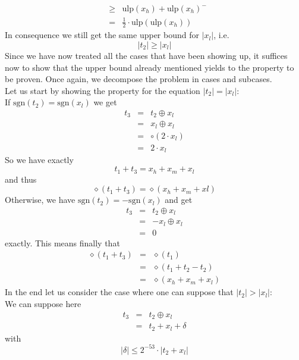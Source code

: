 \documentclass[a4paper,10pt,twoside]{article}
\newenvironment{proof}[1][Proof]{\begin{trivlist}
\item[\hskip \labelsep {\bfseries #1}]}{\end{trivlist}}
\newcommand{\hi}{\ensuremath{\mathit{h}}}
\newcommand{\mi}{\ensuremath{\mathit{m}}}
\newcommand{\lo}{\ensuremath{\mathit{l}}}
\newcommand{\mUlp}{\ensuremath{\mathrm{ulp}}}
\newcommand{\sgn}{\ensuremath{\mathrm{sgn}}}
\begin{document}
\begin{proof}
\begin{eqnarray*}
& \geq & \mUlp\left( x_\hi \right) + \mUlp\left( x_\hi \right)^- \\
& = & \frac{1}{2} \cdot \mUlp\left( \mUlp\left( x_\hi \right) \right)
\end{eqnarray*}
In consequence we still get the same upper bound for $\left \vert x_\lo \right \vert$, i.e.
$$\left \vert t_2 \right \vert \geq \left \vert x_\lo \right \vert$$
Since we have now treated all the cases that have been showing up, it suffices now to show that the upper bound
already mentioned yields to the property to be proven. Once again, we decompose the problem in cases and subcases.\\
Let us start by showing the property for the equation $\left \vert t_2 \right \vert = \left \vert x_\lo \right \vert$: \\
If $\sgn\left( t_2 \right) = \sgn\left( x_\lo \right)$ we get
\begin{eqnarray*}
t_3 & = & t_2 \oplus x_\lo \\
& = & x_\lo \oplus x_\lo \\
& = & \circ \left( 2 \cdot x_\lo \right) \\
& = & 2 \cdot x_\lo
\end{eqnarray*}
So we have exactly
$$t_1 + t_3 = x_\hi + x_\mi + x_\lo$$
and thus
$$\diamond \left( t_1 + t_3 \right) = \diamond \left( x_\hi + x_\mi + x\lo \right)$$
Otherwise, we have $\sgn\left( t_2 \right) = -\sgn\left( x_\lo \right)$ and get
\begin{eqnarray*}
t_3 & = & t_2 \oplus x_\lo \\
& = & - x_\lo \oplus x_\lo \\
& = & 0
\end{eqnarray*}
exactly.
This means finally that
\begin{eqnarray*}
\diamond \left( t_1 + t_3 \right) & = & \diamond \left( t_1 \right) \\
& = & \diamond \left( t_1 + t_2 - t_2 \right) \\
& = & \diamond \left( x_\hi + x_\mi + x_\lo \right)
\end{eqnarray*}
In the end let us consider the case where one can suppose that
$\left \vert t_2 \right \vert > \left \vert x_\lo \right \vert$: \\
We can suppose here
\begin{eqnarray*}
t_3 & = & t_2 \oplus x_\lo \\
& = & t_2 + x_\lo + \delta
\end{eqnarray*}
with
$$\left \vert \delta \right \vert \leq 2^{-53} \cdot \left \vert t_2 + x_\lo \right \vert$$

\end{proof}
\end{document}
